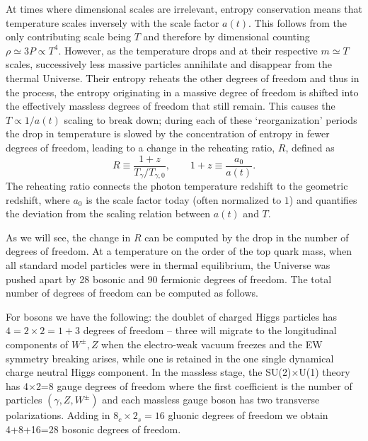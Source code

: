 At times where dimensional scales are irrelevant, entropy conservation means that temperature scales inversely with the scale factor $a(t)$. This follows from the only contributing scale being $T$ and therefore by dimensional counting $ \rho\simeq 3P \propto T^4$. However, as the temperature drops and at their respective $m\simeq T$ scales, successively less massive particles annihilate and disappear from the thermal Universe. Their entropy reheats the other degrees of freedom and thus in the process, the entropy originating in a massive degree of freedom is shifted into the effectively massless degrees of freedom that still remain. This causes the $T\propto 1/a(t)$ scaling to break down; during each of these `reorganization' periods the drop in temperature is slowed by the concentration of entropy in fewer degrees of freedom, leading to a change in the reheating ratio, $R$, defined as
\begin{equation}\label{redshiftratio}
R\equiv \frac{1+z}{ T_\gamma/T_{\gamma,0}}, \qquad 1+z\equiv \frac{a_{0}}{a(t)}.
\end{equation}
The reheating ratio connects the photon temperature redshift to the geometric redshift, where $a_0$ is the scale factor today (often normalized to $1$) and quantifies the deviation from the scaling relation between $a(t)$ and $T$.

As we will see, the change in $R$ can be computed by the drop in the number of degrees of freedom. At a temperature on the order of the top quark mass, when all standard model particles were in thermal equilibrium, the Universe was pushed apart by 28 bosonic and 90 fermionic degrees of freedom. The total number of degrees of freedom can be computed as follows. 

For bosons we have the following: the doublet of charged Higgs particles has $4=2\times2=1+3$ degrees of freedom -- three will migrate to the longitudinal components of $W^\pm, Z$ when the electro-weak vacuum freezes and the EW symmetry breaking arises, while one is retained in the one single dynamical charge neutral Higgs component. In the massless stage, the SU(2)$\times$U(1) theory has 4$\times$2=8 gauge degrees of freedom where the first coefficient is the number of particles $(\gamma, Z, W^\pm)$ and each massless gauge boson has two transverse polarizations. Adding in $8_c\times2_s=16$ gluonic degrees of freedom we obtain 4+8+16=28 bosonic degrees of freedom. 

